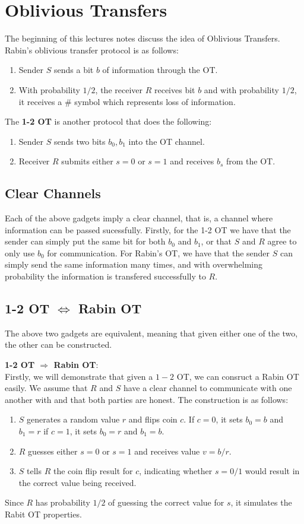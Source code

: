 \documentclass[11pt]{article}
\begin{document}
\section{Oblivious Transfers}
The beginning of this lectures notes discuss the idea of Oblivious Transfers. Rabin's oblivious transfer protocol is as follows:
\begin{enumerate}
    \item Sender $S$ sends a bit $b$ of information through the OT.
    \item With probability $1/2$, the receiver $R$ receives bit $b$ and with probability $1/2$, it receives a $\#$ symbol which represents loss of information.
\end{enumerate}
The \textbf{1-2 OT} is another protocol that does the following:
\begin{enumerate}
    \item Sender $S$ sends two bits $b_0, b_1$ into the OT channel.
    \item Receiver $R$ submits either $s=0$ or $s=1$ and receives $b_s$ from the OT. 
\end{enumerate}

\subsection{Clear Channels}
Each of the above gadgets imply a clear channel, that is, a channel where information can be passed sucessfully. Firstly, for the 1-2 OT we have that the sender can simply put the same bit for both $b_0$ and $b_1$, or that $S$ and $R$ agree to only use $b_0$ for communication. For Rabin's OT, we have that the sender $S$ can simply send the same information many times, and with overwhelming probability the information is transfered successfully to $R$.

\subsection{1-2 OT $\Longleftrightarrow$ Rabin OT}
The above two gadgets are equivalent, meaning that given either one of the two, the other can be constructed.
\bigskip

\textbf{1-2 OT $\Longrightarrow$ Rabin OT}:\\
Firstly, we will demonstrate that given a $1-2$ OT, we can consruct a Rabin OT easily. We assume that $R$ and $S$ have a clear channel to communicate with one another with and that both parties are honest. The construction is as follows:
\begin{enumerate}
    \item $S$ generates a random value $r$ and flips coin $c$. If $c=0$, it sets $b_0 = b$ and $b_1 = r$ if $c=1$, it sets $b_0=r$ and $b_1=b$.
    \item $R$ guesses either $s=0$ or $s=1$ and receives value $v = b/r$.
    \item $S$ tells $R$ the coin flip result for $c$, indicating whether $s=0/1$ would result in the correct value being received.
\end{enumerate}
Since $R$ has probability $1/2$ of guessing the correct value for $s$, it simulates the Rabit OT properties.
\bigskip
\end{document}

